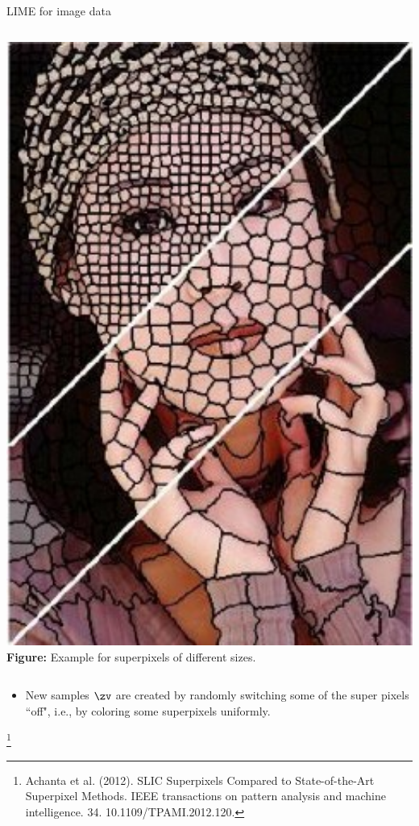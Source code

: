 \documentclass[11pt,compress,t,notes=noshow, aspectratio=169, xcolor=table]{beamer}
\begin{document}
\begin{vbframe}{LIME for image data}
\begin{columns}
\begin{column}{0.26\textwidth}
\begin{center}
				\includegraphics[width=1\textwidth]{figure/superpixel_woman}
				\tiny{\textbf{Figure:} Example for superpixels of different sizes.}
			\end{center}
		\end{column}
	\end{columns}
			\begin{itemize}
		\item New samples $\zv$ are created by randomly switching some of the super pixels ``off", i.e., by coloring some superpixels uniformly.  
\end{itemize}
\footnote[frame]{Achanta et al. (2012). SLIC Superpixels Compared to State-of-the-Art Superpixel Methods. IEEE transactions on pattern analysis and machine intelligence. 34. 10.1109/TPAMI.2012.120. }
\end{vbframe}
\end{document}
